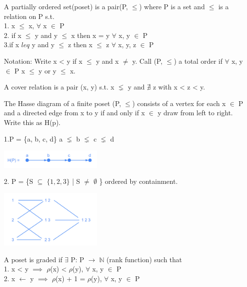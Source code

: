 \begin{definition}
     A partially ordered set(poset) is a pair(P, $\leq$) where P is a set and $\leq$ is a relation on P s.t.\\
     1. x $\leq$ x, $\forall$ x $\in$ P\\
     2. if x $\leq$ y and y $\leq$ x then x = y $\forall$ x, y $\in$ P\\
     3.if x $leq$ y and y $\leq$ z then x $\leq$ z $\forall$ x, y, z $\in$ P
 \end{definition}

    Notation: Write x < y if x $\leq$ y and x $\neq$ y. Call (P, $\leq$) a total order if $\forall$ x, y $\in$ P x $\leq$ y or y $\leq$ x.\\
    
\begin{definition}
    A cover relation is a pair (x, y) s.t. x $\lneq$ y and $\nexists$ z with x < z < y.
\end{definition}

\begin{definition}
    The Hasse diagram of a finite poset (P, $\leq$) consists of a vertex for each x $\in$ P and a directed edge from x to y if and only if x $\in$ y draw from left to right. Write this as H(p).
\end{definition}

\begin{example}
    1.P = \{a, b, c, d\} a $\lneq$ b $\lneq$ c $\lneq$ d
    \begin{center}
        \includegraphics[width=2in]{images/Chapter 10/abcd.png}
    \end{center}
    2. P = \{S $\subseteq$ $\{1,2,3\}$ | S $\neq$ $\emptyset$ \} ordered by containment.
    \begin{center}
        \includegraphics[width=2in]{images/Chapter 10/P123.png}
    \end{center}
\end{example}

\begin{definition}
    A poset is graded if $\exists$ P: P $\rightarrow$ $\mathbb{N}$ (rank function) such that\\
    1. x < y $\implies$ $\rho$(x) < $\rho$(y), $\forall$ x, y $\in$ P\\
    2. x $\leftarrow$ y $\implies$ $\rho$(x) + 1 = $\rho$(y), $\forall$ x, y $\in$ P
\end{definition}

